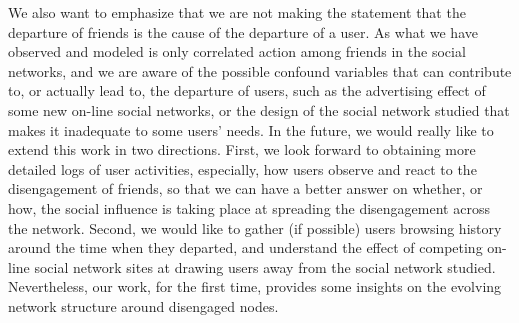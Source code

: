 \documentclass[phd,tocprelim]{cornell}
\begin{document}
We also want to emphasize that we are not making the statement that the departure of friends is the cause of the departure of a user. As what we have observed and modeled is only correlated action among friends in the social networks, and we are aware of the possible confound variables that can contribute to, or actually lead to, the departure of users, such as the advertising effect of some new on-line social networks, or the design of the social network studied that makes it inadequate to some users' needs. In the future, we would really like to extend this work in two directions. First, we look forward to obtaining more detailed logs of user activities, especially, how users observe and react to the disengagement of friends, so that we can have a better answer on whether, or how, the social influence is taking place at spreading the disengagement across the network. Second, we would like to gather (if possible) users browsing history around the time when they departed, and understand the effect of competing on-line social network sites at drawing users away from the social network studied. Nevertheless, our work, for the first time, provides some insights on the evolving  network structure around disengaged nodes.



% 
\end{document}
